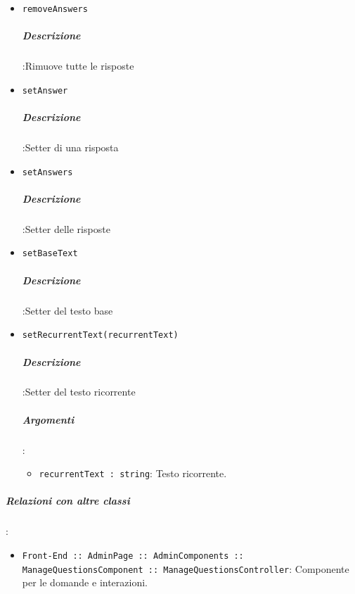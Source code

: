 \documentclass[../ManualeSviluppatore_v1.0.0.tex]{subfiles}
\begin{document}
\begin{itemize}
		      	\item \texttt{removeAnswers}
		      	      \subparagraph{Descrizione}:Rimuove tutte le risposte

		      	\item \texttt{setAnswer}
		      	      \subparagraph{Descrizione}:Setter di una risposta

		      	\item \texttt{setAnswers}
		      	      \subparagraph{Descrizione}:Setter delle risposte

		      	\item \texttt{setBaseText}
		      	      \subparagraph{Descrizione}:Setter del testo base

		      	\item \texttt{setRecurrentText(recurrentText)}
		      	      \subparagraph{Descrizione}:Setter del testo ricorrente
					\subparagraph{Argomenti}:
						\begin{itemize}
							\item \texttt{recurrentText : string}:
								Testo ricorrente.
						\end{itemize}
		      \end{itemize}\vspace{0.5em}
		\subparagraph{Relazioni con altre classi}:
		      \begin{itemize}
		      	\item \texttt{Front-End :: AdminPage :: AdminComponents :: ManageQuestionsComponent :: ManageQuestionsController}: Componente per le domande e interazioni.
		      \end{itemize}
\end{document}
